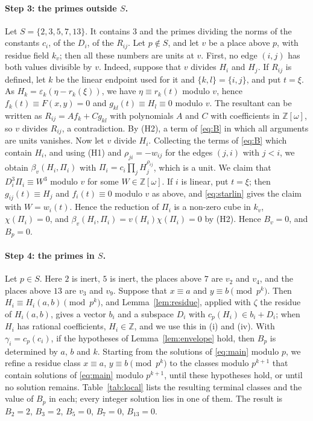 \documentclass[11pt]{article}
\newcommand{\Z}{\mathbb{Z}}
\begin{document}
\paragraph{Step 3: the primes outside $S$.} Let $S=\{2,3,5,7,13\}$. It contains $3$ and the primes dividing the norms of the constants $c_i$, of the $D_i$, of the $R_{ij}$. Let $p\notin S$, and let $v$ be a place above $p$, with residue field $k_v$; then all these numbers are units at $v$. First, no edge $(i,j)$ has both values divisible by $v$. Indeed, suppose that $v$ divides $H_i$ and $H_j$. If $R_{ij}$ is defined, let $k$ be the linear endpoint used for it and $\{k,l\}=\{i,j\}$, and put $t=\xi$. As $H_k=\varepsilon_k(\eta-r_k(\xi))$, we have $\eta\equiv r_k(t)$ modulo $v$, hence $f_k(t)\equiv F(x,y)=0$ and $g_{kl}(t)\equiv H_l\equiv0$ modulo $v$. The resultant can be written as $R_{ij}=Af_k+Cg_{kl}$ with polynomials $A$ and $C$ with coefficients in $\Z[\omega]$, so $v$ divides $R_{ij}$, a contradiction. By (H2), a term of \eqref{eq:B} in which all arguments are units vanishes. Now let $v$ divide $H_i$. Collecting the terms of \eqref{eq:B} which contain $H_i$, and using (H1) and $\rho_{ji}=-w_{ij}$ for the edges $(j,i)$ with $j<i$, we obtain $\beta_v(H_i,\Pi_i)$ with $\Pi_i=c_i\prod_jH_j^{\rho_{ij}}$, which is a unit. We claim that $D_i^3\Pi_i\equiv W^3$ modulo $v$ for some $W\in\Z[\omega]$. If $i$ is linear, put $t=\xi$; then $g_{ij}(t)\equiv H_j$ and $f_i(t)\equiv0$ modulo $v$ as above, and \eqref{eq:starlin} gives the claim with $W=w_i(t)$. Hence the reduction of $\Pi_i$ is a non-zero cube in $k_v$, $\chi(\Pi_i)=0$, and $\beta_v(H_i,\Pi_i)=v(H_i)\chi(\Pi_i)=0$ by (H2). Hence $B_v=0$, and $B_p=0$.

\paragraph{Step 4: the primes in $S$.} Let $p\in S$. Here $2$ is inert, $5$ is inert, the places above $7$ are $v_{2}$ and $v_{4}$, and the places above $13$ are $v_{3}$ and $v_{9}$. Suppose that $x\equiv a$ and $y\equiv b\pmod{p^k}$. Then $H_i\equiv H_i(a,b)\pmod{p^k}$, and Lemma~\ref{lem:residue}, applied with $\zeta$ the residue of $H_i(a,b)$, gives a vector $b_i$ and a subspace $D_i$ with $c_p(H_i)\in b_i+D_i$; when $H_i$ has rational coefficients, $H_i\in\Z$, and we use this in (i) and (iv). With $\gamma_i=c_p(c_i)$, if the hypotheses of Lemma~\ref{lem:envelope} hold, then $B_p$ is determined by $a$, $b$ and $k$. Starting from the solutions of \eqref{eq:main} modulo $p$, we refine a residue class $x\equiv a$, $y\equiv b\pmod{p^k}$ to the classes modulo $p^{k+1}$ that contain solutions of \eqref{eq:main} modulo $p^{k+1}$, until these hypotheses hold, or until no solution remains. Table~\ref{tab:local} lists the resulting terminal classes and the value of $B_p$ in each; every integer solution lies in one of them. The result is $B_{2}=2$, $B_{3}=2$, $B_{5}=0$, $B_{7}=0$, $B_{13}=0$.
\end{document}
